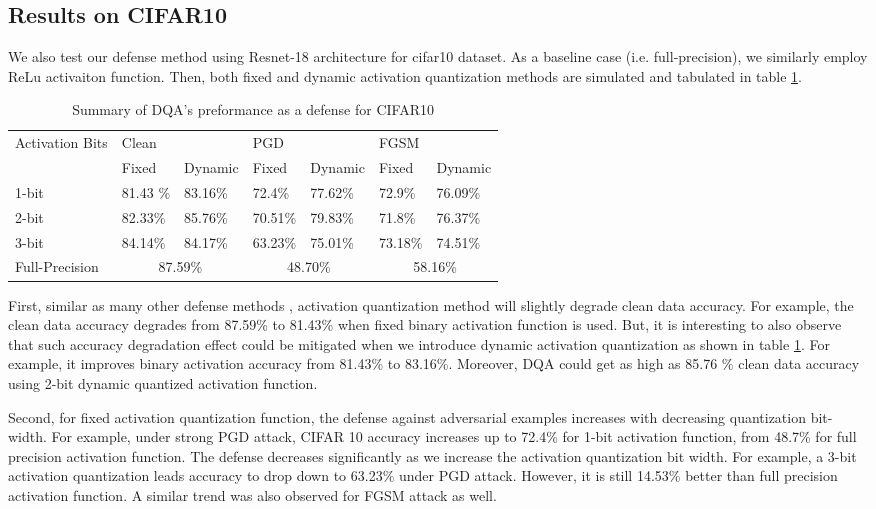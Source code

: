 \documentclass{article}
\begin{document}
 

\subsection{Results on CIFAR10}
We also test our defense method using Resnet-18 architecture for cifar10 dataset. As a baseline case (i.e. full-precision), we similarly employ ReLu activaiton function. Then, both fixed and dynamic activation quantization methods are simulated and tabulated in table \ref{my-label}.





\begin{table}[ht]
\begin{tabular}{|l|l|l|l|l|l|l|}
\hline
\multirow{2}{*}{Activation Bits} & \multicolumn{2}{l|}{Clean} & \multicolumn{2}{l|}{PGD} & \multicolumn{2}{l|}{FGSM} \\ \cline{2-7} 
 & Fixed & Dynamic & Fixed & Dynamic & Fixed & Dynamic \\ \hline
1-bit & 81.43 \% & 83.16\% & 72.4\% & 77.62\% & 72.9\% & 76.09\% \\ \hline
2-bit & 82.33\% & 85.76\% & 70.51\% & 79.83\% & 71.8\% & 76.37\% \\ \hline
3-bit & 84.14\% & 84.17\% & 63.23\% & 75.01\% & 73.18\% & 74.51\% \\ \hline
Full-Precision & \multicolumn{2}{c|}{87.59\%} & \multicolumn{2}{c|}{48.70\%} & \multicolumn{2}{c|}{58.16\%} \\ \hline
\end{tabular}
\centering
\caption{Summary of DQA's preformance as a defense for CIFAR10}
\label{my-label}
\end{table}

First, similar as many other defense methods \cite{madry2017towards,qian2018l2}, activation quantization method will slightly degrade clean data accuracy. For example, the clean data accuracy degrades from 87.59\% to 81.43\% when fixed binary activation function is used. But, it is interesting to also observe that such accuracy degradation effect could be mitigated when we introduce dynamic activation quantization as shown in table \ref{my-label}. For example, it improves binary activation accuracy from 81.43\% to 83.16\%. Moreover, DQA could get as high as 85.76 \% clean data accuracy using 2-bit dynamic quantized activation function.

Second, for fixed activation quantization function, the defense against adversarial examples increases with decreasing quantization bit-width. For example, under strong PGD attack, CIFAR 10 accuracy increases up to 72.4\% for 1-bit activation function, from 48.7\% for full precision activation function. The defense decreases significantly as we increase the activation  quantization bit width. For example, a 3-bit activation quantization leads accuracy to drop down to 63.23\% under PGD attack. However, it is still 14.53\% better than full precision activation function. A similar trend was also observed for FGSM attack as well.
\end{document}
